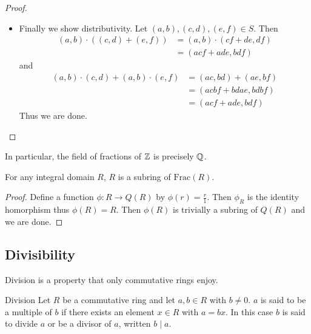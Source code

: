 \documentclass[a4paper]{article}
\begin{document}
\begin{prp}{}{}
\begin{proof}
\begin{itemize}
\item Finally we show distributivity. Let $(a,b),(c,d),(e,f)\in S$. Then 
\begin{align*}
(a,b)\cdot((c,d)+(e,f))&=(a,b)\cdot(cf+de,df)\\
&=(acf+ade,bdf)
\end{align*}
and 
\begin{align*}
(a,b)\cdot(c,d)+(a,b)\cdot(e,f)&=(ac,bd)+(ae,bf)\\
&=(acbf+bdae,bdbf)\\
&=(acf+ade,bdf)\tag{equivalence relation}
\end{align*}
Thus we are done. 
\end{itemize}
\end{proof}
\end{prp}

In particular, the field of fractions of $\mathbb{Z}$ is precisely $\mathbb{Q}$. 

\begin{lmm}{}{} For any integral domain $R$, $R$ is a subring of $\text{Frac}(R)$. 
\begin{proof}
Define a function $\phi:R\to Q(R)$ by $\phi(r)=\frac{r}{1}$. Then $\phi_R$ is the identity homorphism thus $\phi(R)=R$. Then $\phi(R)$ is trivially a subring of $Q(R)$ and we are done. 
\end{proof}
\end{lmm}

\subsection{Divisibility}
Division is a property that only commutative rings enjoy. 

\begin{defn}{Division}{} Let $R$ be a commutative ring and let $a,b\in R$ with $b\neq 0$. $a$ is said to be a multiple of $b$ if there exists an element $x\in R$ with $a=bx$. In this case $b$ is said to divide $a$ or be a divisor of $a$, written $b\;|\;a$. 
\end{defn}
\end{document}
